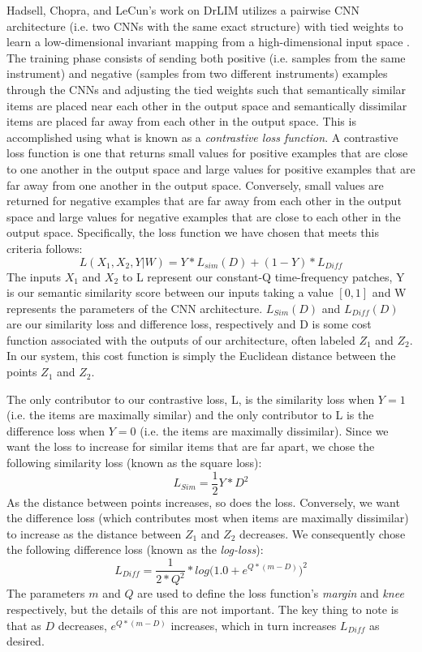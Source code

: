 \documentclass[a4paper,12pt]{report} 	%
\numberwithin{figure}{chapter}
\numberwithin{table}{chapter}
\numberwithin{equation}{chapter}
\begin{document}
\begin{flushleft}
Hadsell, Chopra, and LeCun's work on DrLIM utilizes a pairwise CNN architecture (i.e. two CNNs with the same exact structure) with tied weights to learn a low-dimensional invariant mapping from a high-dimensional input space \cite{hadsell2006dimensionality}. The training phase consists of sending both positive (i.e. samples from the same instrument) and negative (samples from two different instruments) examples through the CNNs and adjusting the tied weights such that semantically similar items are placed near each other in the output space and semantically dissimilar items are placed far away from each other in the output space. This is accomplished using what is known as a \emph{contrastive loss function}. A contrastive loss function is one that returns small values for positive examples that are close to one another in the output space and large values for positive examples that are far away from one another in the output space. Conversely, small values are returned for negative examples that are far away from each other in the output space and large values for negative examples that are close to each other in the output space. Specifically, the loss function we have chosen that meets this criteria follows:
\begin{equation}
L(X_1, X_2, Y|W)=Y*L_{sim}(D)+(1-Y)*L_{Diff}
\end{equation}
The inputs $X_1$ and $X_2$ to L represent our constant-Q time-frequency patches, Y is our semantic similarity score between our inputs taking a value $[0,1]$ and W represents the parameters of the CNN architecture. $L_{Sim}(D)$ and $L_{Diff}(D)$ are our similarity loss and difference loss, respectively and D is some cost function associated with the outputs of our architecture, often labeled $Z_1$ and $Z_2$. In our system, this cost function is simply the Euclidean distance between the points $Z_1$ and $Z_2$.

The only contributor to our contrastive loss, L, is the similarity loss when $Y=1$ (i.e. the items are maximally similar) and the only contributor to L is the difference loss when $Y=0$ (i.e. the items are maximally dissimilar). Since we want the loss to increase for similar items that are far apart, we chose the following similarity loss (known as the square loss):
\begin{equation}
L_{Sim}=\frac{1}{2}Y*D^2
\end{equation}
As the distance between points increases, so does the loss. Conversely, we want the difference loss (which contributes most when items are maximally dissimilar) to increase as the distance between $Z_1$ and $Z_2$ decreases. We consequently chose the following difference loss (known as the \emph{log-loss}):
\begin{equation}
L_{Diff}=\frac{1}{2*Q^2}*log\Big(1.0+e^{Q*(m-D)}\Big)^2
\end{equation}
The parameters $m$ and $Q$ are used to define the loss function's \emph{margin} and \emph{knee} respectively, but the details of this are not important. The key thing to note is that as $D$ decreases, $e^{Q*(m-D)}$ increases, which in turn increases $L_{Diff}$ as desired.


\end{flushleft}
\end{document}
